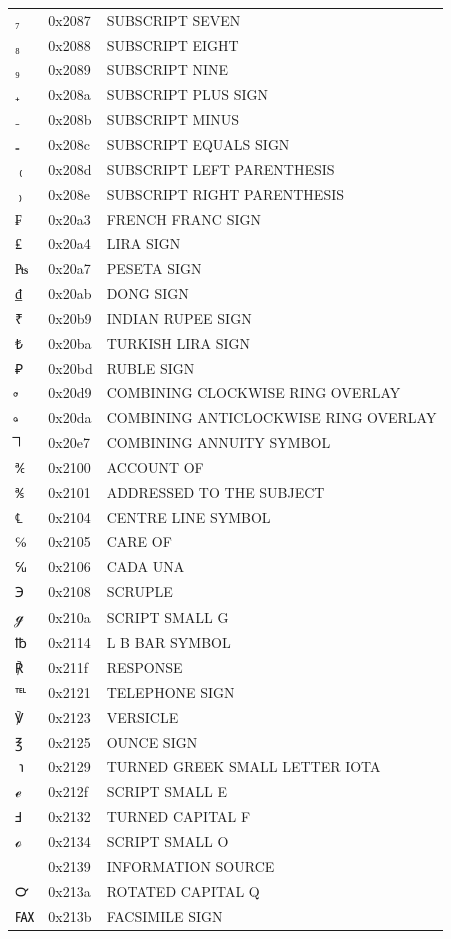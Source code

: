 \documentclass[12pt, twoside]{article}
\begin{document}
\begin{longtable}{L{1.0cm} L{2.0cm} >{\footnotesize}L{10cm}}
$₇$&0x2087&SUBSCRIPT SEVEN\\
$₈$&0x2088&SUBSCRIPT EIGHT\\
$₉$&0x2089&SUBSCRIPT NINE\\
$₊$&0x208a&SUBSCRIPT PLUS SIGN\\
$₋$&0x208b&SUBSCRIPT MINUS\\
$₌$&0x208c&SUBSCRIPT EQUALS SIGN\\
$₍$&0x208d&SUBSCRIPT LEFT PARENTHESIS\\
$₎$&0x208e&SUBSCRIPT RIGHT PARENTHESIS\\
$₣$&0x20a3&FRENCH FRANC SIGN\\
$₤$&0x20a4&LIRA SIGN\\
$₧$&0x20a7&PESETA SIGN\\
$₫$&0x20ab&DONG SIGN\\
$₹$&0x20b9&INDIAN RUPEE SIGN\\
$₺$&0x20ba&TURKISH LIRA SIGN\\
$₽$&0x20bd&RUBLE SIGN\\
$⃙$&0x20d9&COMBINING CLOCKWISE RING OVERLAY\\
$⃚$&0x20da&COMBINING ANTICLOCKWISE RING OVERLAY\\
$⃧$&0x20e7&COMBINING ANNUITY SYMBOL\\
$℀$&0x2100&ACCOUNT OF\\
$℁$&0x2101&ADDRESSED TO THE SUBJECT\\
$℄$&0x2104&CENTRE LINE SYMBOL\\
$℅$&0x2105&CARE OF\\
$℆$&0x2106&CADA UNA\\
$℈$&0x2108&SCRUPLE\\
$ℊ$&0x210a&SCRIPT SMALL G\\
$℔$&0x2114&L B BAR SYMBOL\\
$℟$&0x211f&RESPONSE\\
$℡$&0x2121&TELEPHONE SIGN\\
$℣$&0x2123&VERSICLE\\
$℥$&0x2125&OUNCE SIGN\\
$℩$&0x2129&TURNED GREEK SMALL LETTER IOTA\\
$ℯ$&0x212f&SCRIPT SMALL E\\
$Ⅎ$&0x2132&TURNED CAPITAL F\\
$ℴ$&0x2134&SCRIPT SMALL O\\
&0x2139&INFORMATION SOURCE\\
$℺$&0x213a&ROTATED CAPITAL Q\\
$℻$&0x213b&FACSIMILE SIGN\\

\end{longtable}
\end{document}
